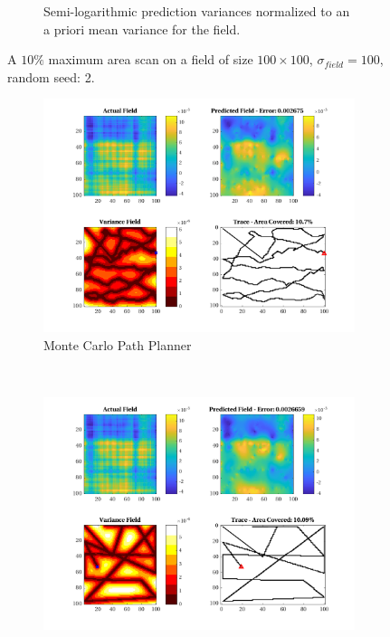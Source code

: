 \begin{figure}[htb!]
\begin{subfigure}[t]{0.65\textwidth}
        \captionsetup{skip=0.20\baselineskip,size=footnotesize}
        \caption{Semi-logarithmic prediction variances normalized to an a priori mean variance for the field.}
        \label{fig:prederrs_sigma100_p10_s2}
    \end{subfigure}
    \captionsetup{skip=0.20\baselineskip}
    \caption{A $10\%$ maximum area scan on a field of size $100 \times 100$, $\sigma_{field} = 100$, random seed: 2.}
    \label{fig:sigma100_p10_s2}
\end{figure}

\begin{figure}[htb!]
    \centering
    \begin{subfigure}[t]{0.5\textwidth}
        \centering
        \includegraphics[width=\linewidth]{figures/hbresults/mc_10p_100x100_sf_100_seed_2.png}
        \captionsetup{skip=0.10\baselineskip,size=footnotesize}
        \caption{Monte Carlo Path Planner}
    \end{subfigure}%
    ~ 
    \begin{subfigure}[t]{0.5\textwidth}
        \centering
        \includegraphics[width=\linewidth]{figures/hbresults/nhv_10p_100x100_sf_100_seed_2.png}

\end{subfigure}
\end{figure}
